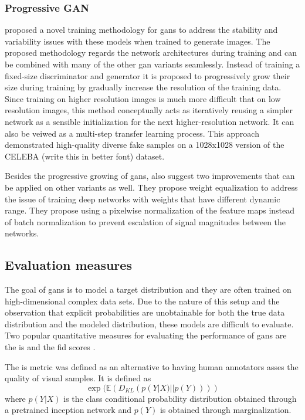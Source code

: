 \subsubsection{Progressive GAN}
\textcite{karras2017progressive} proposed a novel training methodology for \acrshort{gans} to address the stability and variability issues with these models when trained to generate images. The proposed methodology regards the network architectures during training and can be combined with many of the other \acrshort{gan} variants seamlessly. Instead of training a fixed-size discriminator and generator it is proposed to progressively grow their size during training by gradually increase the resolution of the training data. Since training on higher resolution images is much more difficult that on low resolution images, this method conceptually acts as iteratively reusing a simpler network as a sensible initialization for the next higher-resolution network. It can also be veiwed as a multi-step transfer learning process. This approach demonstrated high-quality diverse fake samples on a 1028x1028 version of the CELEBA (write this in better font) dataset. 

Besides the progressive growing of \acrshort{gans}, \textcite{karras2017progressive} also suggest two improvements that can be applied on other variants as well. They propose weight equalization to address the issue of training deep networks with weights that have different dynamic range. They propose using a pixelwise normalization of the feature maps instead of batch normalization to prevent escalation of signal magnitudes between the networks.

\subsection{Evaluation measures}
The goal of \acrshort{gans} is to model a target distribution and they are often trained on high-dimensional complex data sets. Due to the nature of this setup and the observation that explicit probabilities are unobtainable for both the true data distribution and the modeled distribution, these models are difficult to evaluate. Two popular quantitative measures for evaluating the performance of \acrshort{gans} are the \acrfull{is} \parencite{salimans2016improved} and the \acrfull{fid} scores \parencite{heuselRUNKH2017FID}.

The \acrlong{is} metric was defined as an alternative to having human annotators asses the quality of visual samples. It is defined as 
\begin{equation}
    \exp (\mathbb{E}(D_{KL}(p(Y|X) || p(Y))))
\end{equation}
where $p(Y|X)$ is the class conditional probability distribution obtained through a pretrained inception network and $p(Y)$ is obtained through marginalization. 

